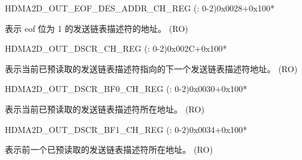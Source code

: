 \begin{register}{H}{DMA2D\_OUT\_EOF\_DES\_ADDR\_CH\_REG (: 0-2)}{0x0028+0x100*}\label{regdesc:DMA2DOUTEOFDESADDRCHNREG}
%
\regnewline%
\begin{regdesc}\begin{reglist}
\label{fielddesc:DMA2DOUTEOFDESADDRCHN}\item [DMA2D\_OUT\_EOF\_DES\_ADDR\_CH\regindex{n}] 表示 eof 位为 1 的发送链表描述符的地址。 (RO)
\end{reglist}\end{regdesc}
\end{register}


\begin{register}{H}{DMA2D\_OUT\_DSCR\_CH\_REG (: 0-2)}{0x002C+0x100*}\label{regdesc:DMA2DOUTDSCRCHNREG}
%
\regnewline%
\begin{regdesc}\begin{reglist}
\label{fielddesc:DMA2DOUTLINKDSCRCHN}\item [DMA2D\_OUTLINK\_DSCR\_CH\regindex{n}] 表示当前已预读取的发送链表描述符指向的下一个发送链表描述符地址。 (RO)
\end{reglist}\end{regdesc}
\end{register}


\begin{register}{H}{DMA2D\_OUT\_DSCR\_BF0\_CH\_REG (: 0-2)}{0x0030+0x100*}\label{regdesc:DMA2DOUTDSCRBF0CHNREG}
\regnewline%
\begin{regdesc}\begin{reglist}
\label{fielddesc:DMA2DOUTLINKDSCRBF0CHN}\item [DMA2D\_OUTLINK\_DSCR\_BF0\_CH\regindex{n}] 表示当前已预读取的发送链表描述符所在地址。 (RO)
\end{reglist}\end{regdesc}
\end{register}


\begin{register}{H}{DMA2D\_OUT\_DSCR\_BF1\_CH\_REG (: 0-2)}{0x0034+0x100*}\label{regdesc:DMA2DOUTDSCRBF1CHNREG}
%
\regnewline%
\begin{regdesc}\begin{reglist}
\label{fielddesc:DMA2DOUTLINKDSCRBF1CHN}\item [DMA2D\_OUTLINK\_DSCR\_BF1\_CH\regindex{n}] 表示前一个已预读取的发送链表描述符所在地址。 (RO)
\end{reglist}\end{regdesc}
\end{register}




